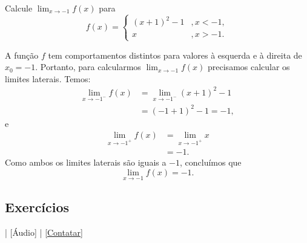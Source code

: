 \begin{exeresol}
  Calcule $\lim_{x\to -1} f(x)$ para
  \begin{equation}
    f(x) = \left\{
      \begin{array}{ll}
        (x+1)^2-1 &, x<-1,\\
        x &, x>-1.
      \end{array}
\right.
  \end{equation}
\end{exeresol}
\begin{resol}
  A função $f$ tem comportamentos distintos para valores à esquerda e à direita de $x_0=-1$. Portanto, para calcularmos $\lim_{x\to -1} f(x)$ precisamos calcular os limites laterais. Temos:
  \begin{align}
    \lim_{x\to -1^-} f(x) &= \lim_{x\to -1^-} (x+1)^2-1\\
                          &= (-1+1)^2-1 = -1,
  \end{align}
  e
  \begin{align}
    \lim_{x\to -1^+} f(x) &= \lim_{x\to -1^+} x\\
                          &= -1.
  \end{align}
  Como ambos os limites laterais são iguais a $-1$, concluímos que
  \begin{equation}
    \lim_{x\to -1} f(x) = -1.
  \end{equation}
\end{resol}

\subsection*{Exercícios}

\begin{flushright}
  [Vídeo] | [Áudio] | \href{https://phkonzen.github.io/notas/contato.html}{[Contatar]}
\end{flushright}


